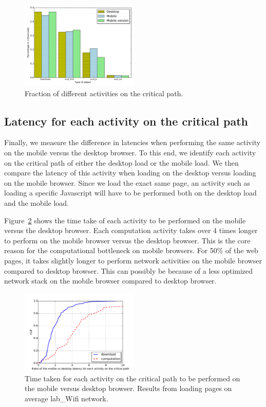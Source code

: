 \begin{figure}[!htb]
  \centering
    \includegraphics[width=0.5\textwidth]{./figures/criticalpath/bar_plot_percentage.pdf}
  \caption{Fraction of different activities on the critical path. }
  \label{fig:bar_plot_percentage}
\end{figure}

\subsection{Latency for each activity on the critical path}

Finally, we measure the difference in latencies when performing the same activity on the mobile versus the desktop browser.  To this end, we identify each activity on the critical path of either the desktop load or the mobile load. We then compare the latency of this activity when loading on the desktop versus loading on the mobile browser. Since we load the exact same page, an activity such as loading a specific Javascript  will have to be performed both on the desktop load and the mobile load.

\noindent Figure~\ref{fig:bar_plot_percentage} shows the time take of each activity to be performed on the mobile versus the desktop browser. Each computation activity takes over 4 times longer to perform on the mobile browser versus the desktop browser. This is the core reason for the computational bottleneck on mobile browsers. For 50\% of the web pages, it takes slightly longer to perform network activities on the mobile browser compared to desktop browser. This can possibly be because of a less optimized network stack on the mobile browser compared to desktop browser.

\begin{figure}[!htb]
  \centering
    \includegraphics[width=0.5\textwidth]{./figures/criticalpath/latency_comp_network_b20-d50.pdf}
  \caption{Time taken for each activity on the critical path to be performed on the mobile versus desktop browser. Results from loading pages on average lab\_Wifi network. }
  \label{fig:bar_plot_percentage}
\end{figure}




